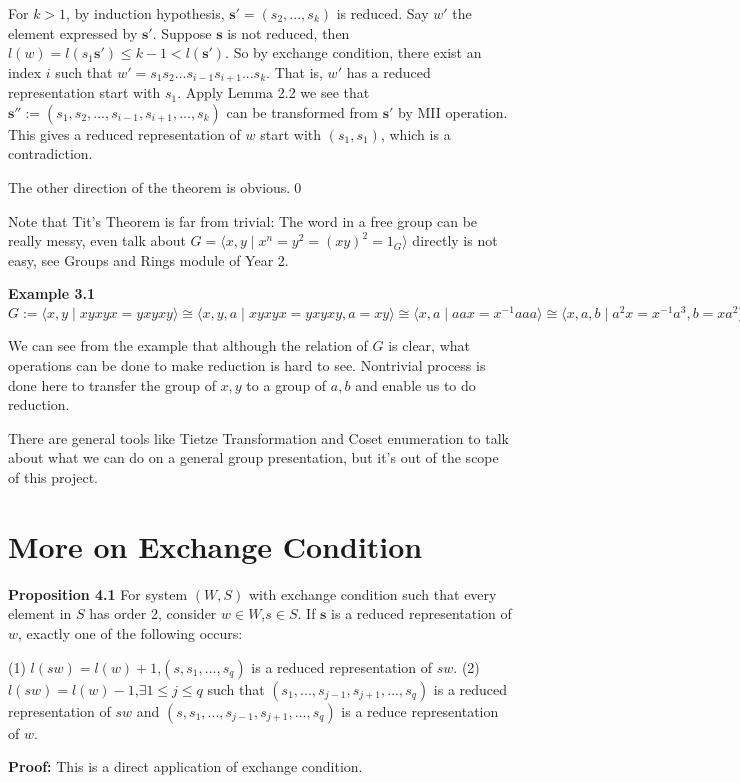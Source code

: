 For $k>1$, by induction hypothesis, $\mathbf{s'}=(s_2,...,s_k)$ is reduced. Say $w'$ the element expressed by $\mathbf{s'}$. Suppose $\mathbf{s}$ is not reduced, then $l(w)=l(s_1\mathbf{s'})\le k-1 < l(\mathbf{s'})$. So by exchange condition, there exist an index $i$ such that $w'=s_1s_2...s_{i-1}s_{i+1}...s_k$. That is, $w'$ has a reduced representation start with $s_1$. Apply Lemma 2.2 we see that $\mathbf{s''}:=(s_1,s_2,...,s_{i-1},s_{i+1},...,s_k)$ can be transformed from $\mathbf{s'}$ by MII operation. This gives a reduced representation of $w$ start with $(s_1,s_1)$, which is a contradiction. 

The other direction of the theorem is obvious.\qed

\vspace{\baselineskip}
Note that Tit's Theorem is far from trivial: The word in a free group can be really messy, even talk about $G=\langle x,y \mid x^n=y^2=(xy)^2=1_G \rangle$ directly is not easy, see Groups and Rings module of Year 2. 

\vspace{\baselineskip}
\noindent \textbf{Example 3.1} $G:=\langle x,y \mid xyxyx=yxyxy \rangle \cong \langle x,y,a \mid xyxyx=yxyxy,a=xy\rangle \cong \langle x,a \mid aax=x^{-1} aaa\rangle \cong \langle x,a,b \mid a^2x=x^{-1}a^3,b=xa^2\rangle \cong \langle a,b \mid a^2=b^5\rangle$

We can see from the example that although the relation of $G$ is clear, what operations can be done to make reduction is hard to see. Nontrivial process is done here to transfer the group of $x,y$ to a group of $a,b$ and enable us to do reduction.

There are general tools like Tietze Transformation and Coset enumeration to talk about what we can do on a general group presentation, but it's out of the scope of this project.

\section{More on Exchange Condition}
\noindent \textbf{Proposition 4.1} For system $(W,S)$ with exchange condition such that every element in $S$ has order 2, consider $w\in W$,$s\in S$. If $\mathbf{s}$ is a reduced representation of $w$, exactly one of the following occurs:

(1) $l(sw)=l(w)+1$,$(s,s_1,...,s_q)$ is a reduced representation of $sw$.
(2) $l(sw)=l(w)-1$,$\exists 1\le j \le q$  such that $(s_1,...,s_{j-1},s_{j+1},...,s_q)$ is a reduced representation of $sw$ and $(s,s_1,...,s_{j-1},s_{j+1},...,s_q)$ is a reduce representation of $w$. 

\noindent \textbf{Proof:} This is a direct application of exchange condition.